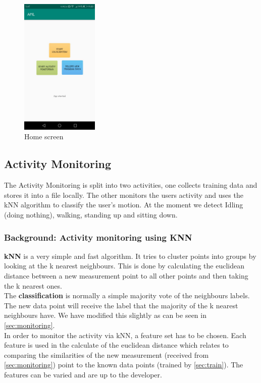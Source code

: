 \documentclass[12pt]{article}
\begin{document}
\begin{figure}
	\centering
	\includegraphics[width=140px]{images/main.jpeg}
	\caption{Home screen}
	\label{fig:main}
\end{figure}

\subsection{Activity Monitoring}\label{sec:activitymonitoring}
The Activity Monitoring is split into two activities, one collects training data and stores it into a file locally. The other monitors the users activity and uses the kNN algorithm to classify the user's motion. At the moment we detect Idling (doing nothing), walking, standing up and sitting down.

\subsubsection{Background: Activity monitoring using KNN}\label{sec:knnbackground}
\textbf{kNN} is a very simple and fast algorithm. It tries to cluster points into groups by looking at the k nearest neighbours. This is done by calculating the euclidean distance between a new measurement point to all other points and then taking the k nearest ones. 
\\
The \textbf{classification} is normally a simple majority vote of the neighbours labels. The new data point will receive the label that the majority of the k nearest neighbours have. We have modified this slightly as can be seen in \ref{sec:monitoring}.
\\
In order to monitor the activity via kNN, a feature set has to be chosen. Each feature is used in the calculate of the euclidean distance which relates to comparing the similarities of the new measurement (received from \ref{sec:monitoring}) point to the known data points (trained by \ref{sec:train}). The features can be varied and are up to the developer.
\end{document}
